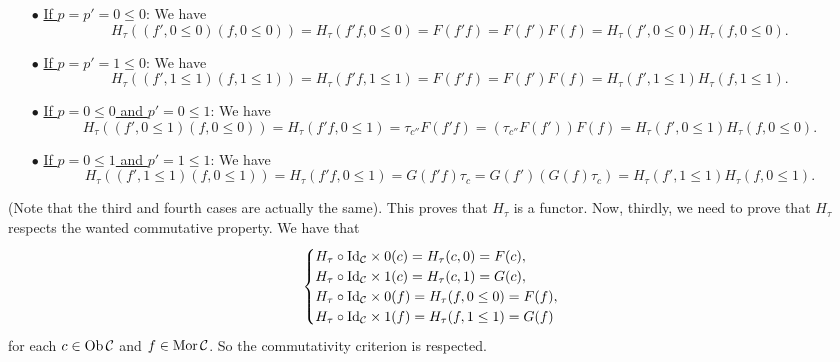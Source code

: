 \documentclass[11pt, a4paper, twoside]{article}
\begin{document}
 	\begin{itemize}
		\item[$\bullet$] \underline{If $p=p'=0\leq0$}: We have $$H_\tau((f',0\leq0)(f,0\leq0))=H_\tau(f'f,0\leq0)=F(f'f)=F(f')F(f)=H_\tau(f',0\leq0)H_\tau(f,0\leq0).$$
		\item[$\bullet$] \underline{If $p=p'=1\leq0$}: We have $$H_\tau((f',1\leq1)(f,1\leq1))=H_\tau(f'f,1\leq1)=F(f'f)=F(f')F(f)=H_\tau(f',1\leq1)H_\tau(f,1\leq1).$$
		\item[$\bullet$] \underline{If $p=0\leq0$ and $p'=0\leq1$}: We have $$H_\tau((f',0\leq1)(f,0\leq0))=H_\tau(f'f,0\leq1)=\tau_{c''}F(f'f)=(\tau_{c''}F(f'))F(f)=H_\tau(f',0\leq1)H_\tau(f,0\leq0).$$
		\item[$\bullet$] \underline{If $p=0\leq1$ and $p'=1\leq1$}:  We have $$H_\tau((f',1\leq1)(f,0\leq1))=H_\tau(f'f,0\leq1)=G(f'f)\tau_{c}=G(f')(G(f)\tau_{c})=H_\tau(f',1\leq1)H_\tau(f,0\leq1).$$
	\end{itemize}
	(Note that the third and fourth cases are actually the same). This proves that $H_\tau$ is a functor. Now, thirdly, we need to prove that $H_\tau$ respects the wanted commutative property. We have that
	$$\begin{cases}
		 H_\tau\circ\mathrm{Id}_{\mathcal{C}}\times{0}(c)=H_\tau(c,0)=F(c), \\
		 H_\tau\circ\mathrm{Id}_{\mathcal{C}}\times{1}(c)=H_\tau(c,1)=G(c), \\
		 H_\tau\circ\mathrm{Id}_{\mathcal{C}}\times{0}(f)=H_\tau(f,0\leq0)=F(f), \\
		 H_\tau\circ\mathrm{Id}_{\mathcal{C}}\times{1}(f)=H_\tau(f,1\leq1)=G(f)
	\end{cases}$$
	for each $c\in\operatorname{Ob}\mathcal{C}$ and $f\in\operatorname{Mor}\mathcal{C}$. So the commutativity criterion is respected.\newpage
	
\end{document}
